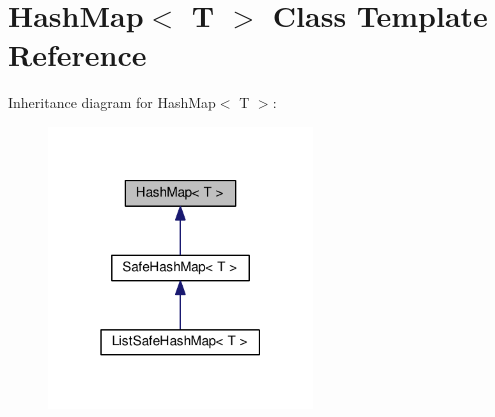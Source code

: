 \hypertarget{classHashMap}{}\section{Hash\+Map$<$ T $>$ Class Template Reference}
\label{classHashMap}


Inheritance diagram for Hash\+Map$<$ T $>$\+:
\nopagebreak
\begin{figure}[H]
\begin{center}
\leavevmode
\includegraphics[width=199pt]{classHashMap__inherit__graph}
\end{center}
\end{figure}
